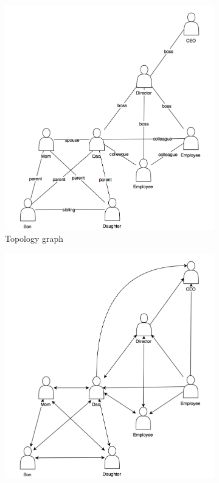 \begin{figure}
\begin{subfigure}{0.5\textwidth}
\includegraphics[width=\linewidth]{images/socialnetwork_topology.png}
\caption{Topology graph} \label{fig:2_1a}
\end{subfigure}
\hspace*{\fill} %
\begin{subfigure}{0.5\textwidth}
\includegraphics[width=\linewidth]{images/socialnetwork_trust.png}

\end{subfigure}
\end{figure}

